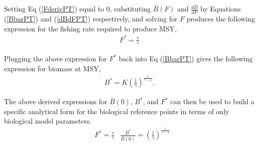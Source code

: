 \documentclass[12pt]{article}
\begin{document}
Setting Eq (\ref{FderivPT}) equal to 0, substituting $\bar B(F)$ and 
$\frac{d \bar B}{dF}$ by Equations (\ref{BbarPT}) and (\ref{dBdFPT}) respectively, 
and solving for $F$ produces the following expression for the fishing 
rate required to produce MSY, %
%
\begin{align}
F^* = \frac{r}{\gamma}%
\end{align}

%
Plugging the above expression for $F^*$ back into Eq (\ref{BbarPT}) gives the 
following expression for biomass at MSY, 
\begin{align}
B^* = K\left(\frac{1}{\gamma}\right)^{\frac{1}{\gamma-1}} \label{BmsyPT}. %
\end{align}

%
The above derived expressions for $\bar B(0)$, $B^*$, and $F^*$ can then be used to 
build a specific analytical form for the biological reference points in terms of only 
biological model parameters.
\begin{align}
&F^* = \frac{r}{\gamma}
&\frac{B^*}{\bar B(0)} = \left(\frac{1}{\gamma}\right)^{\frac{1}{\gamma-1}}
\end{align}
\end{document}
